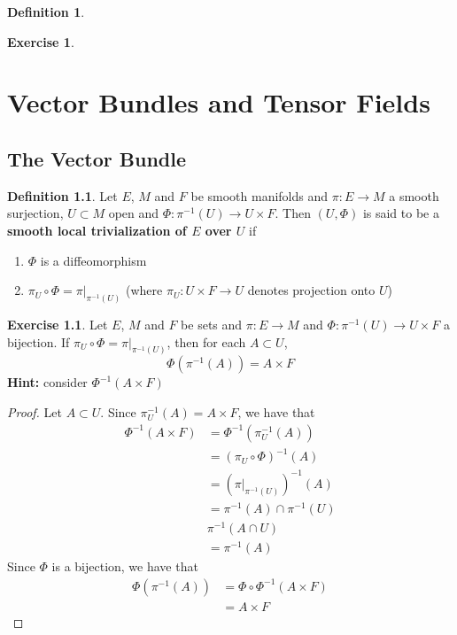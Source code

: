 \documentclass{book}
\theoremstyle{definition}
\newtheorem{defn}[definition]{Definition}
\newtheorem{ex}[definition]{Exercise}
\DeclareMathOperator*{\0}{\mbf{0}}
\DeclareMathOperator*{\1}{\mbf{1}}
\newcommand{\tbf}[1]{\textbf{#1}}
\begin{document}
	
	
	
	\begin{defn}
	
	\end{defn}	
	
	\begin{ex}
	
	\end{ex}	
	
	
	
	
	
	
	
	
	

	
	\newpage
	\chapter{Vector Bundles and Tensor Fields}
	
	\section{The Vector Bundle}
	
	\begin{defn}
		Let $E$, $M$ and $F$ be smooth manifolds and $\pi: E \rightarrow M$ a smooth surjection, $U \subset M$ open and $\Phi: \pi^{-1}(U) \rightarrow U \times F$. Then $(U, \Phi)$ is said to be a \textbf{smooth local trivialization of $E$ over $U$}  if 
		\begin{enumerate}
			\item $\Phi$ is a diffeomorphism
			\item $\pi_U \circ \Phi = \pi|_{\pi^{-1}(U)}$ (where $\pi_U: U \times F \rightarrow U$ denotes projection onto $U$)
		\end{enumerate}
	\end{defn}

	\begin{ex}
		Let $E$, $M$ and $F$ be sets and $\pi: E \rightarrow M$ and $\Phi: \pi^{-1}(U) \rightarrow U \times F$ a bijection. If $\pi_U \circ \Phi = \pi|_{\pi^{-1}(U)}$, then for each $A \subset U$, $$\Phi( \pi^{-1}(A)) = A \times F$$
		\tbf{Hint:} consider $\Phi^{-1}(A \times F)$ 
	\end{ex}
	
	\begin{proof}
		Let $A \subset U$. Since $\pi_U^{-1}(A) = A \times F$, we have that 
		\begin{align*}
			\Phi^{-1}(A \times F)
			& = \Phi^{-1}(\pi_U^{-1}(A)) \\
			& = (\pi_U \circ \Phi)^{-1}(A) \\
			& = (\pi|_{\pi^{-1}(U)})^{-1}(A) \\
			& = \pi^{-1}(A) \cap \pi^{-1}(U) \\
			&  \pi^{-1}(A \cap U) \\
			& = \pi^{-1}(A)
		\end{align*}
		Since $\Phi$ is a bijection, we have that
		\begin{align*}
			\Phi (\pi^{-1}(A))
			&= \Phi \circ \Phi^{-1}(A \times F) \\
			&= A \times F
		\end{align*}
	\end{proof}
\end{document}
